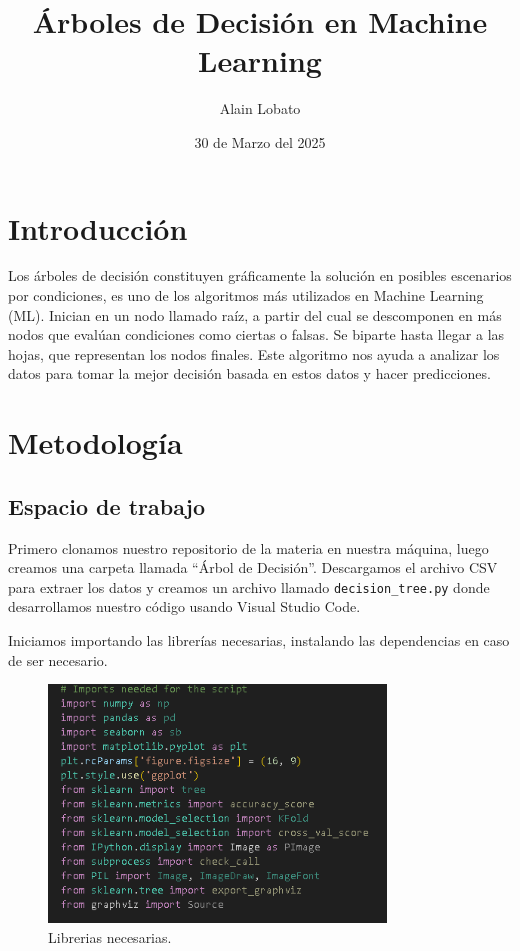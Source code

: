 \documentclass[a4paper,12pt]{article}
\title{\textbf{Árboles de Decisión en Machine Learning}}
\author{Alain Lobato}
\date{30 de Marzo del 2025}
\begin{document}
\maketitle

\section{Introducción}
Los árboles de decisión constituyen gráficamente la solución en posibles escenarios por condiciones, es uno de los algoritmos más utilizados en Machine Learning (ML). Inician en un nodo llamado raíz, a partir del cual se descomponen en más nodos que evalúan condiciones como ciertas o falsas. Se biparte hasta llegar a las hojas, que representan los nodos finales. Este algoritmo nos ayuda a analizar los datos para tomar la mejor decisión basada en estos datos y hacer predicciones.

\section{Metodología}
\subsection{Espacio de trabajo}
Primero clonamos nuestro repositorio de la materia en nuestra máquina, luego creamos una carpeta llamada ``Árbol de Decisión''. Descargamos el archivo CSV para extraer los datos y creamos un archivo llamado \texttt{decision\_tree.py} donde desarrollamos nuestro código usando Visual Studio Code.

Iniciamos importando las librerías necesarias, instalando las dependencias en caso de ser necesario.

\begin{figure}[H]
    \centering
    \includegraphics[width=0.8\textwidth]{1.png}
    \caption{Librerias necesarias.}
    \label{fig:decision_tree}
\end{figure}
\end{document}
